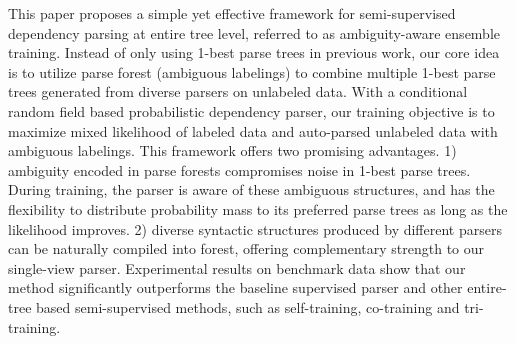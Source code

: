 This paper proposes a simple yet effective framework for semi-supervised dependency parsing at entire tree level, referred to as ambiguity-aware ensemble training. Instead of only using 1-best parse trees in previous work, our core idea is to utilize parse forest (ambiguous labelings) to combine multiple 1-best parse trees generated from diverse parsers on unlabeled data. With a conditional random field based probabilistic dependency parser, our training objective is to maximize mixed likelihood of labeled data and auto-parsed unlabeled data with ambiguous labelings. This framework offers two promising advantages. 1) ambiguity encoded in parse forests compromises noise in 1-best parse trees. During training, the parser is aware of these ambiguous structures, and has the flexibility to distribute probability mass to its preferred parse trees as long as the likelihood improves. 2) diverse syntactic structures produced by different parsers can be naturally compiled into forest, offering complementary strength to our single-view parser. Experimental results on benchmark data show that our method significantly outperforms the baseline supervised parser and other entire-tree based semi-supervised methods, such as self-training, co-training and tri-training.
